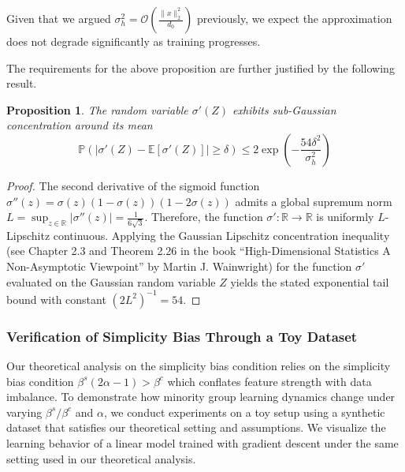 \documentclass[letter,11pt]{article}
\newtheorem{proposition}{Proposition}
\begin{document}
Given that we argued $\sigma_h^2 = \mathcal{O}(\frac{\|x\|_2^2}{d_0})$ previously, we expect the approximation does not degrade significantly as training progresses.

The requirements for the above proposition are further justified by the following result.

\begin{proposition}
The random variable $\sigma'(Z)$ exhibits sub-Gaussian concentration around its mean
\begin{equation}
\mathbb{P} \left( \big| \sigma'(Z) - \mathbb{E}[\sigma'(Z)] \big| \ge \delta \right) \le 2 \exp \left( - \frac{54 \delta^2}{\sigma_h^2} \right)
\end{equation}
\end{proposition}
\begin{proof}
The second derivative of the sigmoid function $\sigma''(z) = \sigma(z)(1-\sigma(z))(1-2\sigma(z))$ admits a global supremum norm $L = \sup_{z \in \mathbb{R}} |\sigma''(z)| = \frac{1}{6\sqrt{3}}$. Therefore, the function $\sigma': \mathbb{R} \to \mathbb{R}$ is uniformly $L$-Lipschitz continuous. Applying the Gaussian Lipschitz concentration inequality (see Chapter 2.3 and Theorem 2.26 in the book ``High-Dimensional Statistics A Non-Asymptotic Viewpoint'' by Martin J. Wainwright) for the function $\sigma'$ evaluated on the Gaussian random variable $Z$ yields the stated exponential tail bound with constant $(2L^2)^{-1} = 54$.
\end{proof}

\subsubsection{Verification of Simplicity Bias Through a Toy Dataset}

Our theoretical analysis on the simplicity bias condition relies on the simplicity bias condition $\beta^s(2\alpha-1) > \beta^c$ which conflates feature strength with data imbalance. To demonstrate how minority group learning dynamics change under varying $\beta^s/\beta^c$ and $\alpha$, we conduct experiments on a toy setup using a synthetic dataset that satisfies our theoretical setting and assumptions. We visualize the learning behavior of a linear model trained with gradient descent under the same setting used in our theoretical analysis.
\end{document}
